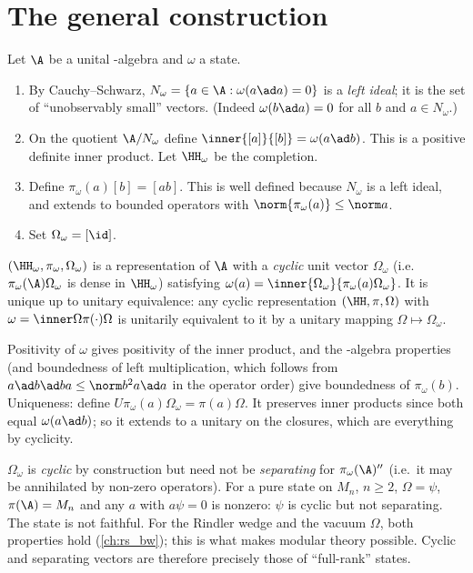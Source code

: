 \section{The general construction}

Let $\A$ be a unital \cstar-algebra and $\omega$ a state.
\begin{enumerate}
\item By Cauchy--Schwarz, $N_\omega=\{a\in\A:\omega(a\ad a)=0\}$ is a \emph{left ideal}; it is the set of ``unobservably small'' vectors. (Indeed $\omega(b\ad a)=0$ for all $b$ and $a\in N_\omega$.)
\item On the quotient $\A/N_\omega$ define $\inner{[a]}{[b]}=\omega(a\ad b)$. This is a positive definite inner product. Let $\HH_\omega$ be the completion.
\item Define $\pi_\omega(a)[b]=[ab]$. This is well defined because $N_\omega$ is a left ideal, and extends to bounded operators with $\norm{\pi_\omega(a)}\le\norm a$.
\item Set $\Omega_\omega=[\id]$.
\end{enumerate}

\begin{theorem}[GNS]\label{thm:GNS}
$(\HH_\omega,\pi_\omega,\Omega_\omega)$ is a representation of $\A$ with a \emph{cyclic} unit vector $\Omega_\omega$ (i.e.\ $\pi_\omega(\A)\Omega_\omega$ is dense in $\HH_\omega$) satisfying $\omega(a)=\inner{\Omega_\omega}{\pi_\omega(a)\Omega_\omega}$. It is unique up to unitary equivalence: any cyclic representation $(\HH,\pi,\Omega)$ with $\omega=\inner\Omega{\pi(\cdot)\Omega}$ is unitarily equivalent to it by a unitary mapping $\Omega\mapsto\Omega_\omega$.
\end{theorem}

\begin{proofsketch}
Positivity of $\omega$ gives positivity of the inner product, and the \cstar-algebra properties (and boundedness of left multiplication, which follows from $a\ad b\ad ba\le\norm b^2a\ad a$ in the operator order) give boundedness of $\pi_\omega(b)$. Uniqueness: define $U\pi_\omega(a)\Omega_\omega=\pi(a)\Omega$. It preserves inner products since both equal $\omega(a\ad b)$; so it extends to a unitary on the closures, which are everything by cyclicity.
\end{proofsketch}

\begin{whatwrong}
$\Omega_\omega$ is \emph{cyclic} by construction but need not be \emph{separating} for $\pi_\omega(\A)''$ (i.e.\ it may be annihilated by non-zero operators). For a pure state on $M_n$, $n\ge2$, $\Omega=\psi$, $\pi(\A)=M_n$ and any $a$ with $a\psi=0$ is nonzero: $\psi$ is cyclic but not separating. The state is not faithful. For the Rindler wedge and the vacuum $\Omega$, both properties hold (\cref{ch:rs_bw}); this is what makes modular theory possible. Cyclic and separating vectors are therefore precisely those of ``full-rank'' states.
\end{whatwrong}

